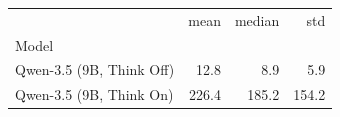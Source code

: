 \begin{tabular}{lrrr}
\toprule
 & mean & median & std \\
Model &  &  &  \\
\midrule
Qwen-3.5 (9B, Think Off) & 12.8 & 8.9 & 5.9 \\
Qwen-3.5 (9B, Think On) & 226.4 & 185.2 & 154.2 \\
\bottomrule
\end{tabular}
